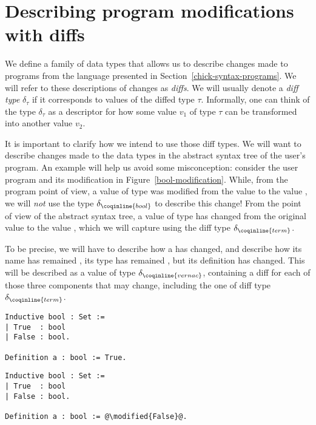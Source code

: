 \section{Describing program modifications with diffs}\label{chick-diffs}

We define a family of data types that allows us to describe changes made to
programs from the language presented in Section~\ref{chick-syntax-programs}.  We
will refer to these descriptions of changes as \textit{diffs}.  We will usually
denote a \textit{diff type} $\delta_{\tau}$ if it corresponds to values of the
diffed type $\tau$.  Informally, one can think of the type $\delta_{\tau}$ as a
descriptor for how some value $v_{1}$ of type $\tau$ can be transformed into
another value $v_{2}$.

It is important to clarify how we intend to use those diff types.  We will want
to describe changes made to the data types in the abstract syntax tree of the
user's program.  An example will help us avoid some misconception: consider the
user program and its modification in Figure~\ref{bool-modification}.  While,
from the program point of view, a value of type  was modified
from the value  to the value , we will
\emph{not} use the type $\delta_{\coqinline{bool}}$ to describe this change!
From the point of view of the abstract syntax tree, a value of type
 has changed from the original value  to
the value , which we will capture using the diff type
$\delta_{\coqinline{term}}$.

To be precise, we will have to describe how a  has
changed, and describe how its name has remained , its type has
remained , but its definition has changed.  This will be
described as a value of type $\delta_{\coqinline{vernac}}$, containing a diff
for each of those three components that may change, including the one of diff
type $\delta_{\coqinline{term}}$.

\begin{figure*}[!htp]

  \noindent%
  \begin{minipage}[t]{0.50\textwidth}
    \begin{verbatim}
Inductive bool : Set :=
| True  : bool
| False : bool.

Definition a : bool := True.
\end{verbatim}
\end{minipage}%
\begin{minipage}[t]{0.50\textwidth}
  \begin{verbatim}
Inductive bool : Set :=
| True  : bool
| False : bool.

Definition a : bool := @\modified{False}@.
\end{verbatim}
\end{minipage}

\caption{A simple program and its modification.}

\label{bool-modification}

\end{figure*}

